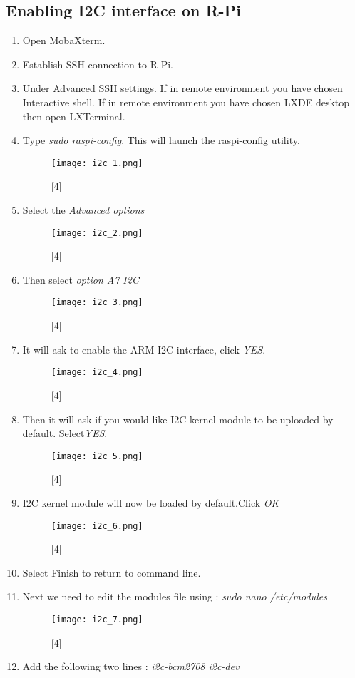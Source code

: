 \documentclass[11pt,a4paper]{article}
\begin{document}
	\subsection{Enabling I2C interface on R-Pi}
	\begin{enumerate}
		\item Open MobaXterm. 
		\item Establish SSH connection to R-Pi.
		\item Under Advanced SSH settings.
		\subitem If in remote environment you have chosen Interactive shell.
		\subitem If in remote environment you have chosen LXDE desktop then open LXTerminal.
		
		\item  Type \textit{sudo raspi-config}. This will launch the raspi-config utility.
		
		\begin{figure}[h!]
			\texttt{[image: i2c\_1.png]}
			\centering
			\caption{[4]}
			\end{figure}
		\item Select the \textit{Advanced options}
		\begin{figure}[h!]
			\texttt{[image: i2c\_2.png]}
			\centering
			\caption{[4]}
		\end{figure} 
		\item Then select \textit{option A7 I2C} 
		\newline
		\begin{figure}[h!]
			\texttt{[image: i2c\_3.png]}
			\centering
			\caption{[4]}
		\end{figure}
		\item It will ask to enable the ARM I2C interface, click \textit{YES}.
		\newline
		\begin{figure}[h!]
			\texttt{[image: i2c\_4.png]}
			\centering
			\caption{[4]}
		\end{figure}
		\newpage
		\item Then it will ask if you would like I2C kernel module to be uploaded by default. Select\textit{YES}.
		\begin{figure}[h!]
			\texttt{[image: i2c\_5.png]}
			\centering
			\caption{[4]}
		\end{figure}
		\item I2C kernel module will now be loaded by default.Click \textit{OK}
		\begin{figure}[h!]
			\texttt{[image: i2c\_6.png]}
			\centering
			\caption{[4]}
		\end{figure}
		\item Select Finish to return to command line.
		\item Next we need to edit the modules file using : \newline \textit{sudo nano /etc/modules} 
		\begin{figure}[h!]
			\texttt{[image: i2c\_7.png]}
			\centering
			\caption{[4]}
		\end{figure}
		\newpage
		\item Add the following two lines : \newline \textit{i2c-bcm2708 \newline i2c-dev}
		

\end{enumerate}
\end{document}
